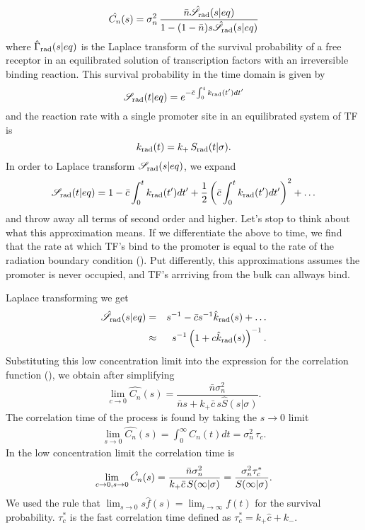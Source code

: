 \begin{equation}
 \hat{C_n}(s) = \sigma_n^2 \, \frac{\bar{n} \hat{\mathscr{S}}_{\rm rad}(s|eq)}{1-(1-\bar{n})s\hat{\mathscr{S}}_{\rm rad}(s|eq)}
 \elabel{LapCorr}
\end{equation}
where $\hat{\Gamma}_{\rm rad}(s|eq)$ is the Laplace transform of the survival probability of a free receptor in an equilibrated solution of transcription factors with an irreversible binding reaction. This survival probability in the time domain is given by \cite{Agmon1990}
\begin{equation}
 \mathscr{S}_{\rm rad}(t|eq) = e^{-\bar{c} \int_0^t k_{\rm rad}(t')dt'}
 \elabel{Seq}
\end{equation}
and the reaction rate with a single promoter site in an equilibrated system of TF is
\begin{equation}
 k_{\rm rad}(t) = k_+ \, S_{\rm rad}(t|\sigma).
\end{equation}
In order to Laplace transform $\mathscr{S}_{\rm rad}(s|eq)$, we expand 
\begin{equation}
 \mathscr{S}_{\rm rad}(t|eq) = 1 - \bar{c} \int_0^t k_{\rm rad}(t')dt' + \frac{1}{2} \left( \bar{c} \int_0^t k_{\rm rad}(t')dt' \right)^2 + \ldots
 \elabel{ApproxLowC}
\end{equation}
and throw away all terms of second order and higher. Let's stop to think about what this approximation means. If we differentiate the above to time, we find that the rate at which TF's bind to the promoter is equal to the rate of the radiation boundary condition (). Put differently, this approximations assumes the promoter is never occupied, and TF's arrriving from the bulk can allways bind. 

Laplace transforming we get
\begin{eqnarray}
 \hat{\mathscr{S}}_{\rm rad}(s|eq) & = & s^{-1} - \bar{c} s^{-1} \hat{k}_{\rm rad}(s) + \ldots \\
  & \approx & s^{-1} \left( 1 + c \hat{k}_{\rm rad}(s)\right)^{-1}.
\elabel{Geq}
\end{eqnarray}
Substituting this low concentration limit into the expression for the correlation function (), we obtain after simplifying
\begin{equation}
 \lim_{c \rightarrow 0} \hat{C_n}(s) = \frac{\bar{n} \sigma_n^2}{\bar{n} s + k_+ \bar{c} \, s \hat{S}(s|\sigma)}.
\end{equation}
The correlation time of the process is found by taking the $s \rightarrow 0$ limit
\begin{eqnarray}
 \lim_{s \rightarrow 0} \hat{C_n}(s) = \int_0^\infty C_n(t) dt = \sigma_n^2 \, \tau_c.
\end{eqnarray}
In the low concentration limit the correlation time is
\begin{equation}
 \lim_{c \rightarrow 0, s \rightarrow 0} \hat{C_n}(s) = \frac{\bar{n} \sigma_n^2}{k_+ \bar{c} \, S(\infty|\sigma)} = \frac{\sigma_n^2 \tau_c^*}{S(\infty|\sigma)}.
 \elabel{CT1}
\end{equation}
We used the rule that $\lim_{s \rightarrow 0} s \hat{f}(s) = \lim_{t \rightarrow \infty} f(t)$ for the survival probability. $\tau_c^*$ is the fast correlation time defined as $\tau_c^* = k_+ \hat{c} + k_-$.

